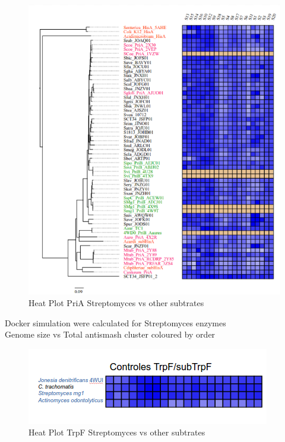 \documentclass[12pt,twoside]{reedthesis}
\begin{document}
  \begin{figure}[h!tbp]
  \centering
  \includegraphics[angle = 0,scale = 0.6]{chapter2/PriAHeatPot.png}
  \caption[Heat Plot PriA Streptomyces vs other subtrates]{\normalsize{Heat Plot PriA Streptomyces vs other subtrates}}
  \label{fig:PriADocking}
  \end{figure}
  
  Docker simulation were calculated for Streptomyces enzymes\\
  Genome size vs Total antismash cluster coloured by order
  
  \begin{figure}[h!tbp]
  \centering
  \includegraphics[angle = 0,scale = 0.6]{chapter2/TrpFHeatPlot.png}
  \caption[Heat Plot TrpF Streptomyces vs other subtrates]{\normalsize{Heat Plot TrpF Streptomyces vs other subtrates}}
  \label{fig:TrpFDocking}
  \end{figure}
  
\end{document}
